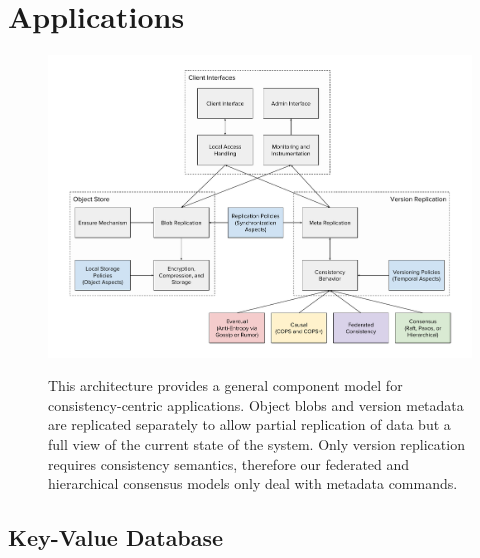 \section{Applications}
\label{ch05_applications}

\begin{landscape}
\begin{figure}
    \begin{center}
        \includegraphics[width=7.2in]{figures/ch05_fluidfs_components.pdf}
    \end{center}
    \renewcommand{\baselinestretch}{1}
    \small\normalsize

    \begin{quote}
        \caption[Application Component Model]{This architecture provides a general component model for consistency-centric applications. Object blobs and version metadata are replicated separately to allow partial replication of data but a full view of the current state of the system. Only version replication requires consistency semantics, therefore our federated and hierarchical consensus models only deal with metadata commands.}
        \label{fig:ch05_fluidfs_components}
    \end{quote}
\end{figure}
\renewcommand{\baselinestretch}{2}
\small\normalsize
\end{landscape}

\subsection{Key-Value Database}
\label{ch05_key_value_db}

